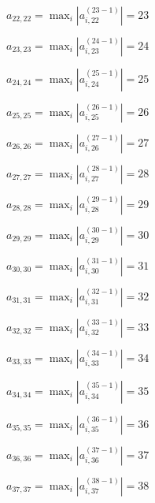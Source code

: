 \documentclass[a4paper,12pt]{article}
\begin{document}
$a _{ 22, 22 } =  \max _i |a _{ i, 22 } ^{ (23 - 1) } | = 23$

$a _{ 23, 23 } =  \max _i |a _{ i, 23 } ^{ (24 - 1) } | = 24$

$a _{ 24, 24 } =  \max _i |a _{ i, 24 } ^{ (25 - 1) } | = 25$

$a _{ 25, 25 } =  \max _i |a _{ i, 25 } ^{ (26 - 1) } | = 26$

$a _{ 26, 26 } =  \max _i |a _{ i, 26 } ^{ (27 - 1) } | = 27$

$a _{ 27, 27 } =  \max _i |a _{ i, 27 } ^{ (28 - 1) } | = 28$

$a _{ 28, 28 } =  \max _i |a _{ i, 28 } ^{ (29 - 1) } | = 29$

$a _{ 29, 29 } =  \max _i |a _{ i, 29 } ^{ (30 - 1) } | = 30$

$a _{ 30, 30 } =  \max _i |a _{ i, 30 } ^{ (31 - 1) } | = 31$

$a _{ 31, 31 } =  \max _i |a _{ i, 31 } ^{ (32 - 1) } | = 32$

$a _{ 32, 32 } =  \max _i |a _{ i, 32 } ^{ (33 - 1) } | = 33$

$a _{ 33, 33 } =  \max _i |a _{ i, 33 } ^{ (34 - 1) } | = 34$

$a _{ 34, 34 } =  \max _i |a _{ i, 34 } ^{ (35 - 1) } | = 35$

$a _{ 35, 35 } =  \max _i |a _{ i, 35 } ^{ (36 - 1) } | = 36$

$a _{ 36, 36 } =  \max _i |a _{ i, 36 } ^{ (37 - 1) } | = 37$

$a _{ 37, 37 } =  \max _i |a _{ i, 37 } ^{ (38 - 1) } | = 38$
\end{document}
